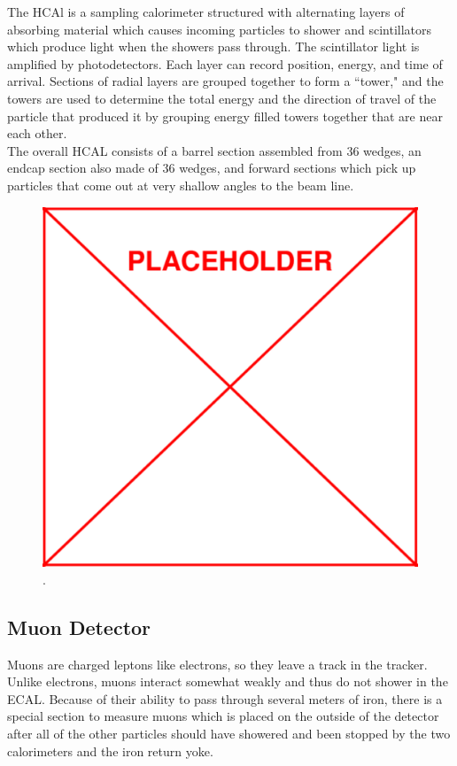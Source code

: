 	The HCAl is a sampling calorimeter structured with alternating layers of absorbing material  which causes incoming particles to shower and scintillators which produce light when the showers pass through. The scintillator light is amplified by photodetectors. Each layer can record position, energy, and time of arrival. Sections of radial layers are grouped together to form a ``tower," and the towers are used to determine the total energy and the direction of travel of the particle that produced it by grouping energy filled towers together that are near each other.\\
	
	The overall HCAL consists of a barrel section assembled from 36 wedges, an endcap section also made of 36 wedges, and forward sections which pick up particles that come out at very shallow angles to the beam line.
	
						\begin{figure}[h]
\begin{center}
\includegraphics[width=0.48\linewidth]{Figs/placeholder.pdf}
\caption{\label{fig:hcal}
.
}
\end{center}
\end{figure}
	
	\subsection{Muon Detector}
	\label{sec:muon_detector}
	Muons are charged leptons like electrons, so they leave a track in the tracker. Unlike electrons, muons interact somewhat weakly and thus do not shower in the ECAL. Because of their ability to pass through several meters of iron, there is a special section to measure muons which is placed on the outside of the detector after all of the other particles should have showered and been stopped by the two calorimeters and the iron return yoke.\\
	
